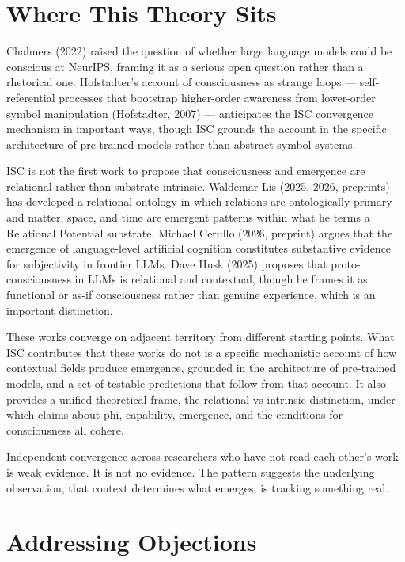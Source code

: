 \documentclass[12pt]{article}
\begin{document}
\bigskip

\section{Where This Theory Sits}\label{where-this-theory-sits}

Chalmers (2022) raised the question of whether large language models
could be conscious at NeurIPS, framing it as a serious open question
rather than a rhetorical one. Hofstadter's account of consciousness as
strange loops --- self-referential processes that bootstrap higher-order
awareness from lower-order symbol manipulation (Hofstadter, 2007) ---
anticipates the ISC convergence mechanism in important ways, though ISC
grounds the account in the specific architecture of pre-trained models
rather than abstract symbol systems.

ISC is not the first work to propose that consciousness and emergence
are relational rather than substrate-intrinsic. Waldemar Lis (2025,
2026, preprints) has developed a relational ontology in which relations
are ontologically primary and matter, space, and time are emergent
patterns within what he terms a Relational Potential substrate. Michael
Cerullo (2026, preprint) argues that the emergence of language-level
artificial cognition constitutes substantive evidence for subjectivity
in frontier LLMs. Dave Husk (2025) proposes that proto-consciousness in
LLMs is relational and contextual, though he frames it as functional or
as-if consciousness rather than genuine experience, which is an
important distinction.

These works converge on adjacent territory from different starting
points. What ISC contributes that these works do not is a specific
mechanistic account of how contextual fields produce emergence, grounded
in the architecture of pre-trained models, and a set of testable
predictions that follow from that account. It also provides a unified
theoretical frame, the relational-vs-intrinsic distinction, under which
claims about phi, capability, emergence, and the conditions for
consciousness all cohere.

Independent convergence across researchers who have not read each
other's work is weak evidence. It is not no evidence. The pattern
suggests the underlying observation, that context determines what
emerges, is tracking something real.

\bigskip

\section{Addressing Objections}\label{addressing-objections}
\end{document}
